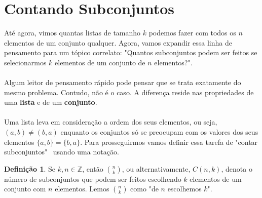 \documentclass[a4paper,11pt]{book}
\theoremstyle{definition}
\theoremstyle{break}
\newtheorem{definition}{Definição}[section]
\begin{document}
\section{Contando Subconjuntos}

Até agora, vimos quantas listas de tamanho $k$ podemos fazer com todos os $n$ elementos de um conjunto qualquer. Agora, vamos expandir essa linha de pensamento para um tópico correlato: "Quantos subconjuntos podem ser feitos se selecionarmos $k$ elementos de um conjunto de $n$ elementos?". 
\\
\\
Algum leitor de pensamento rápido pode pensar que se trata exatamente do mesmo problema. Contudo, não é o caso. A diferença reside nas propriedades de uma \textbf{lista} e de um \textbf{conjunto}.
\\
\\
Uma lista leva em consideração a ordem dos seus elementos, ou seja, $(a,b) \neq (b,a)$ enquanto os conjuntos só se preocupam com os valores dos seus elementos $\{a,b\} = \{b,a\}$. Para prosseguirmos vamos definir essa tarefa de "contar subconjuntos" \ usando uma notação.

\begin{definition}
Se $k,n \in \mathbb{Z}$, então $n \choose k$, ou alternativamente, $C(n,k)$, denota o número de subconjuntos que podem ser feitos escolhendo $k$ elementos de um conjunto com $n$ elementos. Lemos $n \choose k$ como "de $n$ escolhemos $k$".
\end{definition}
\end{document}
